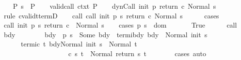 \begin{isabellebody}
\ \ \isamarkupfalse%
\ P{\isacharcolon}\ {\isachardoublequoteopen}s\ {\isasymin}\ P{\isachardoublequoteclose}\isanewline
\ \ \isamarkupfalse%
\ valid{\isacharunderscore}call\ ctxt\ P\isanewline
\ \ \isamarkupfalse%
\ {\isachardoublequoteopen}{\isasymGamma}{\isasymturnstile}dynCall\ init\ p\ return{\isacharprime}\ c{\isasymdown}\ Normal\ s{\isachardoublequoteclose}\isanewline
\ \ \ \ \isamarkupfalse%
\ {\isacharparenleft}rule\ cvalidt{\isacharunderscore}termD{\isacharparenright}\isanewline
\ \ \isamarkupfalse%
\ call{\isacharcolon}\ {\isachardoublequoteopen}{\isasymGamma}{\isasymturnstile}call\ init\ {\isacharparenleft}p\ s{\isacharparenright}\ return{\isacharprime}\ c{\isasymdown}\ Normal\ s{\isachardoublequoteclose}\isanewline
\ \ \ \ \isamarkupfalse%
\ cases\isanewline
\ \ \isamarkupfalse%
\ {\isachardoublequoteopen}{\isasymGamma}{\isasymturnstile}call\ init\ {\isacharparenleft}p\ s{\isacharparenright}\ return\ c\ {\isasymdown}\ Normal\ s{\isachardoublequoteclose}\isanewline
\ \ \isamarkupfalse%
\ {\isacharparenleft}cases\ {\isachardoublequoteopen}p\ s\ {\isasymin}\ dom\ {\isasymGamma}{\isachardoublequoteclose}{\isacharparenright}\isanewline
\ \ \ \ \isamarkupfalse%
\ True\isanewline
\ \ \ \ \isamarkupfalse%
\ call\ \isamarkupfalse%
\ bdy\ \ \isanewline
\ \ \ \ \ \ bdy{\isacharcolon}\ {\isachardoublequoteopen}{\isasymGamma}\ {\isacharparenleft}p\ s{\isacharparenright}\ {\isacharequal}\ Some\ bdy{\isachardoublequoteclose}\ \ termi{\isacharunderscore}bdy{\isacharcolon}\ {\isachardoublequoteopen}{\isasymGamma}{\isasymturnstile}bdy\ {\isasymdown}\ Normal\ {\isacharparenleft}init\ s{\isacharparenright}{\isachardoublequoteclose}\ \ \isanewline
\ \ \ \ \ \ termi{\isacharunderscore}c{\isacharcolon}\ {\isachardoublequoteopen}{\isasymforall}t{\isachardot}\ {\isasymGamma}{\isasymturnstile}{\isasymlangle}bdy{\isacharcomma}Normal\ {\isacharparenleft}init\ s{\isacharparenright}{\isasymrangle}\ {\isasymRightarrow}\ Normal\ t\ {\isasymlongrightarrow}\ \isanewline
\ \ \ \ \ \ \ \ \ \ \ \ \ \ \ \ \ \ \ \ {\isasymGamma}{\isasymturnstile}c\ s\ t\ {\isasymdown}\ Normal\ {\isacharparenleft}return{\isacharprime}\ s\ t{\isacharparenright}{\isachardoublequoteclose}\isanewline
\ \ \ \ \ \ \isamarkupfalse%
\ cases\ auto\ \isanewline
\ \ \ \ \isacommand{{\isacharbraceleft}}\isamarkupfalse%
\isanewline
\ \ \ \ \ \ \isamarkupfalse%

\end{isabellebody}
